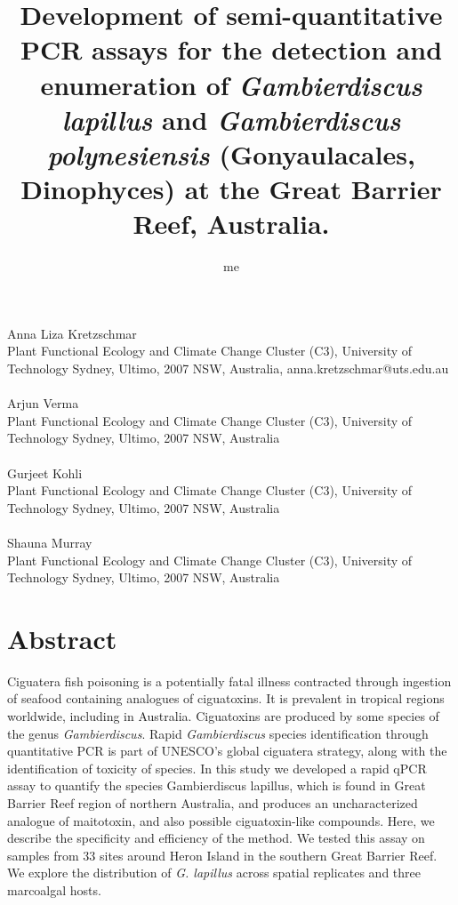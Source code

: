 \documentclass[12pt]{article}
\title{Development of semi-quantitative PCR assays for the detection and enumeration of \emph{Gambierdiscus lapillus} and \emph{Gambierdiscus polynesiensis} (Gonyaulacales, Dinophyces) at the Great Barrier Reef, Australia.}
\author{me}
\date{}
\begin{document}
\maketitle
\paragraph{}Anna Liza Kretzschmar\\
Plant Functional Ecology and Climate Change Cluster (C3), University of Technology Sydney, Ultimo, 2007 NSW, Australia, anna.kretzschmar@uts.edu.au
\paragraph{}Arjun Verma \\
Plant Functional Ecology and Climate Change Cluster (C3), University of Technology Sydney, Ultimo, 2007 NSW, Australia
\paragraph{}Gurjeet Kohli\\
Plant Functional Ecology and Climate Change Cluster (C3), University of Technology Sydney, Ultimo, 2007 NSW, Australia
\paragraph{}Shauna Murray\\
Plant Functional Ecology and Climate Change Cluster (C3), University of Technology Sydney, Ultimo, 2007 NSW, Australia
\newpage
\section{Abstract}
Ciguatera fish poisoning is a potentially fatal illness contracted through ingestion of seafood containing analogues of ciguatoxins. It is prevalent in tropical regions worldwide, including in Australia. Ciguatoxins are produced by some species of the genus \emph{Gambierdiscus}. Rapid \emph{Gambierdiscus} species identification through quantitative PCR is part of UNESCO's global ciguatera strategy, along with the identification of toxicity of species. In this study we developed a rapid qPCR assay to quantify the species Gambierdiscus lapillus, which is found in Great Barrier Reef region of northern Australia, and produces an uncharacterized analogue of maitotoxin, and also possible ciguatoxin-like compounds. Here, we describe the specificity and efficiency of the method. We tested this assay on samples from 33 sites around Heron Island in the southern Great Barrier Reef. We explore the distribution of \emph{G. lapillus} across spatial replicates and three marcoalgal hosts. 
\end{document}
